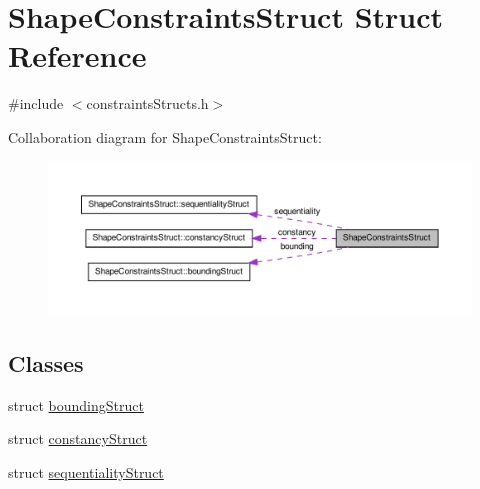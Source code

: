 \hypertarget{structShapeConstraintsStruct}{\section{\-Shape\-Constraints\-Struct \-Struct \-Reference}
\label{structShapeConstraintsStruct}
}


{\ttfamily \#include $<$constraints\-Structs.\-h$>$}



\-Collaboration diagram for \-Shape\-Constraints\-Struct\-:\nopagebreak
\begin{figure}[H]
\begin{center}
\leavevmode
\includegraphics[width=350pt]{structShapeConstraintsStruct__coll__graph}
\end{center}
\end{figure}
\subsection*{\-Classes}
\begin{DoxyCompactItemize}
\item 
struct \hyperlink{structShapeConstraintsStruct_1_1boundingStruct}{bounding\-Struct}
\item 
struct \hyperlink{structShapeConstraintsStruct_1_1constancyStruct}{constancy\-Struct}
\item 
struct \hyperlink{structShapeConstraintsStruct_1_1sequentialityStruct}{sequentiality\-Struct}
\end{DoxyCompactItemize}
